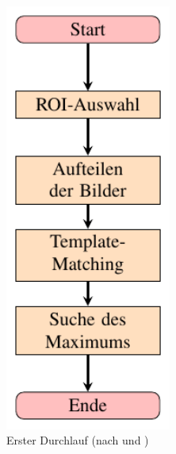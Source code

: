 \begin{figure}[h!]
\begin{subfigure}[b]{0.3\textwidth}
		\label{fig:graph_speckle}
	\end{subfigure}
	\hfill
	\begin{subfigure}[b]{0.3\textwidth}
		\centering
		\includegraphics[width=0.6\textwidth]{pdf/graph_first_pass}
		\caption[Erster Durchlauf]{Erster Durchlauf (nach \cite{Ber12} und \cite{Coj17})}
		\label{fig:graph_first}
	\end{subfigure}
	\hfill
	\begin{subfigure}[b]{0.3\textwidth}
		\centering

\end{subfigure}
\end{figure}
